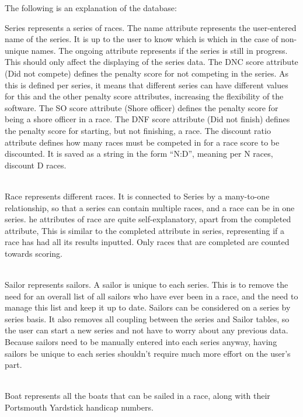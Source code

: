 \documentclass{l4proj}
\begin{document}
The following is an explanation of the database:
\begin{outline}
    \1
    Series represents a series of races.
        \2
        The name attribute represents the user-entered name of the series. It is up to the user to know which is which in the case of non-unique names.
        \2
        The ongoing attribute represents if the series is still in progress. This should only affect the displaying of the series data.
        \2
        The DNC score attribute (Did not compete) defines the penalty score for not competing in the series. As this is defined per series, it means that different series can have different values for this and the other penalty score attributes, increasing the flexibility of the software.
        \2
        The SO score attribute (Shore officer) defines the penalty score for being a shore officer in a race.
        \2
        The DNF score attribute (Did not finish) defines the penalty score for starting, but not finishing, a race.
        \2
        The discount ratio attribute defines how many races must be competed in for a race score to be discounted. It is saved as a string in the form “N:D”, meaning per N races, discount D races.

    \hfill\\
    \1
    Race represents different races. It is connected to Series by a many-to-one relationship, so that a series can contain multiple races, and a race can be in one series. he attributes of race are quite self-explanatory, apart from the completed attribute, This is similar to the completed attribute in series, representing if a race has had all its results inputted. Only races that are completed are counted towards scoring.

    \hfill\\
    \1
    Sailor represents sailors. A sailor is unique to each series. This is to remove the need for an overall list of all sailors who have ever been in a race, and the need to manage this list and keep it up to date. Sailors can be considered on a series by series basis. It also removes all coupling between the series and Sailor tables, so the user can start a new series and not have to worry about any previous data. Because sailors need to be manually entered into each series anyway, having sailors be unique to each series shouldn't require much more effort on the user’s part.

    \hfill\\
    \1
    Boat represents all the boats that can be sailed in a race, along with their Portsmouth Yardstick handicap numbers.


\end{outline}
\end{document}
